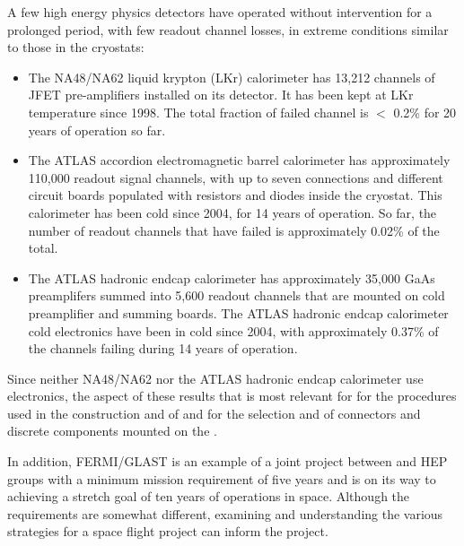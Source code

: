A few high energy physics detectors have operated without intervention for a 
prolonged period, with few readout channel losses, in extreme 
conditions similar to those in the  cryostats:
\begin{itemize}
\item The NA48/NA62 liquid krypton (LKr) calorimeter has 13,212 channels 
of JFET pre-amplifiers installed on its detector. It has been kept at LKr temperature 
since 1998. The total fraction of failed channel is $<$ 0.2\% for 20 years of operation so far.
\item The ATLAS  accordion electromagnetic barrel calorimeter has 
approximately 110,000 readout signal channels, with up to seven connections and different 
circuit boards populated with resistors and diodes inside the cryostat. This
calorimeter has been cold since 2004, for 14 years of operation. So far, the
number of readout channels that have failed is approximately 0.02\% of the total.
\item The ATLAS  hadronic endcap calorimeter has approximately 35,000 GaAs
preamplifers summed into 5,600 readout channels that are mounted on cold preamplifier
and summing boards. The ATLAS  hadronic endcap 
calorimeter cold electronics have been in cold since 2004, with approximately 
0.37\% of the channels failing during 14 years of operation. 
\end{itemize}
Since neither NA48/NA62 nor the ATLAS  hadronic endcap calorimeter
use  electronics, the aspect of these results that is most relevant for  
for the procedures used in the construction and  of  and 
for the selection and  of connectors and discrete components mounted
on the .

In addition, FERMI/GLAST is an example of a joint project between  and HEP groups 
with a minimum mission requirement of five years and is on its way to achieving a 
stretch goal of ten years of operations in space. Although the requirements are somewhat 
different, examining and understanding the various strategies for a space 
flight project can inform the  project. 

